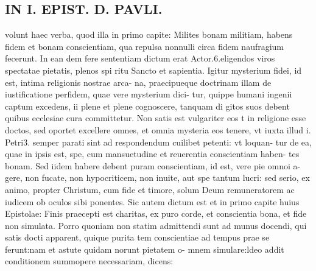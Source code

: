 \documentclass{article}
\begin{document}
\begin{pages}
\section*{IN I. EPIST. D. PAVLI. }
\marginpar{[ p.84 ]}\pstart volunt haec verba, quod illa in primo capite: Milites bonam militiam, habens fidem et bonam conscientiam, qua repulsa nonnulli circa fidem naufragium fecerunt. In ean dem fere sententiam dictum erat Actor.6.eligendos viros spectatae pietatis, plenos spi ritu Sancto et sapientia. Igitur mysterium fidei, id est, intima religionis nostrae arca- na, praecipueque doctrinam illam de iustificatione perfidem, quae vere mysterium dici- tur, quippe humani ingenii captum excedens, ii plene et plene cognoscere, tanquam di gitos suos debent quibus ecclesiae cura committetur. Non satis est vulgariter eos t in religione esse doctos, sed oportet excellere omnes, et omnia mysteria eos tenere, vt iuxta illud i. Petri3. semper parati sint ad respondendum cuilibet petenti: vt loquan- tur de ea, quae in ipsis est, spe, cum mansuetudine et reuerentia conscientiam haben- tes bonam. Sed iidem habere debent puram conscientiam, id est, vere pie omnoi a- gere, non fucate, non hypocriticem, non inuite, aut spe tantum lucri: sed serio, ex animo, propter Christum, cum fide et timore, solum Deum remuneratorem ac iudicem ob oculos sibi ponentes. Sic autem dictum est et in primo capite huius Epistolae: Finis praecepti est charitas, ex puro corde, et conscientia bona, et fide non simulata. Porro quoniam non statim admittendi sunt ad munus docendi, qui satis docti apparent, quique purita tem conscientiae ad tempus prae se ferunt:nam et astute quidam norunt pietatem o- mnem simulare:ldeo addit conditionem summopere necessariam, dicens:  \pend
{}
{}

\end{pages}
\end{document}
